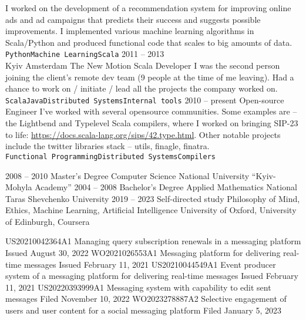 \documentclass[9pt]{developercv} %
\begin{document}
\begin{entrylist}
		{
			I worked on the development of a recommendation system for improving online ads and ad campaigns that predicts their success and suggests possible improvements. I implemented various machine learning algorithms in Scala/Python and produced functional code that scales to big amounts of data.
			\\ \texttt{Python}\slashsep\texttt{Machine Learning}\slashsep\texttt{Scala}
		}
	\entry
		{2011 -- 2013\\\footnotesize{Kyiv \newline Amsterdam}}
		{The New Motion}
		{Scala Developer}
		{
			I was the second person joining the client's remote dev team (9 people at the time of me leaving). Had a chance to work on / initiate / lead all the projects the company worked on.
			\\ \texttt{Scala}\slashsep\texttt{Java}\slashsep\texttt{Distributed Systems}\slashsep\texttt{Internal tools}
		}
	\entry
		{2010 -- present}
		{Open-source}
		{Engineer}
		{
			I've worked with several opensource communities. Some examples are -- the Lightbend and Typelevel Scala compilers, where I worked on bringing SIP-23 to life: \href{https://docs.scala-lang.org/sips/42.type.html}{https://docs.scala-lang.org/sips/42.type.html}. Other notable projects include the twitter libraries stack -- utils, finagle, finatra.\\
			\texttt{Functional Programming}\slashsep\texttt{Distributed Systems}\slashsep\texttt{Compilers}
		}
\end{entrylist}



\begin{entrylist}
	\entry
		{2008 -- 2010}
		{Master's Degree}
		{Computer Science}
		{National University “Kyiv-Mohyla Academy”}
	\entry
		{2004 -- 2008}
		{Bachelor's Degree}
		{Applied Mathematics}
		{National Taras Shevchenko University}
	\entry
		{2019 -- 2023}
		{Self-directed study}
		{Philosophy of Mind, Ethics, Machine Learning, Artificial Intelligence}
		{University of Oxford, University of Edinburgh, Coursera}
\end{entrylist}


\begin{entrylist}
	\entry
		{US20210042364A1}
		{Managing query subscription renewals in a messaging platform}
		{}
		{Issued August 30, 2022}
	\entry
		{WO2021026553A1}
		{Messaging platform for delivering real-time messages}
		{}
		{Issued February 11, 2021}
	\entry
		{US20210044549A1}
		{Event producer system of a messaging platform for delivering real-time messages}
		{}
		{Issued February 11, 2021}
	\entry
		{US20220393999A1}
		{Messaging system with capability to edit sent messages}
		{}
		{Filed November 10, 2022}
	\entry
		{WO2023278887A2}
		{Selective engagement of users and user content for a social messaging platform}
		{}
		{Filed January 5, 2023}
\end{entrylist}
\end{document}

